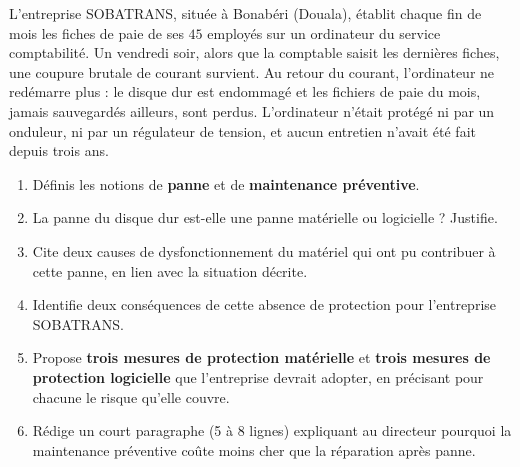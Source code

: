 \documentclass[11pt]{article}
\begin{document}
\begin{exercice}
L'entreprise SOBATRANS, située à Bonabéri (Douala), établit chaque fin de mois les fiches de paie de ses $45$ employés sur un ordinateur du service comptabilité. Un vendredi soir, alors que la comptable saisit les dernières fiches, une coupure brutale de courant survient. Au retour du courant, l'ordinateur ne redémarre plus : le disque dur est endommagé et les fichiers de paie du mois, jamais sauvegardés ailleurs, sont perdus. L'ordinateur n'était protégé ni par un onduleur, ni par un régulateur de tension, et aucun entretien n'avait été fait depuis trois ans.
\begin{enumerate}
\item Définis les notions de \textbf{panne} et de \textbf{maintenance préventive}.
\item La panne du disque dur est-elle une panne matérielle ou logicielle ? Justifie.
\item Cite deux causes de dysfonctionnement du matériel qui ont pu contribuer à cette panne, en lien avec la situation décrite.
\item Identifie deux conséquences de cette absence de protection pour l'entreprise SOBATRANS.
\item Propose \textbf{trois mesures de protection matérielle} et \textbf{trois mesures de protection logicielle} que l'entreprise devrait adopter, en précisant pour chacune le risque qu'elle couvre.
\item Rédige un court paragraphe (5 à 8 lignes) expliquant au directeur pourquoi la maintenance préventive coûte moins cher que la réparation après panne.
\end{enumerate}
\end{exercice}
\end{document}
